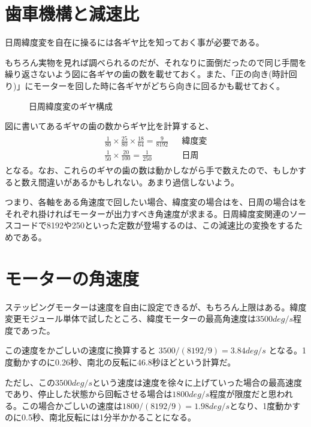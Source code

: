 \documentclass[letterpaper,10pt,dvipdfmx]{sphinxmanual}
\begin{document}
\section{歯車機構と減速比}
\label{\detokenize{nissyu-idohen/kikou:id4}}
日周緯度変を自在に操るには各ギヤ比を知っておく事が必要である。

もちろん実物を見れば調べられるのだが、それなりに面倒だったので同じ手間を繰り返さないよう図に各ギヤの歯の数を載せておく。また、「正の向き(時計回り)」にモーターを回した時に各ギヤがどちら向きに回るかも載せておく。
\begin{figure}[htbp]
\centering
\capstart

\noindent{}
\caption{日周緯度変のギヤ構成}\label{\detokenize{nissyu-idohen/kikou:id6}}\end{figure}

図に書いてあるギヤの歯の数からギヤ比を計算すると、
\begin{equation*}
\begin{split}\begin{aligned}
\frac{1}{80}\times\frac{25}{80}\times\frac{18}{64}=\frac{9}{8192}
&&\text{緯度変} \\
\frac{1}{50}\times\frac{20}{100}=\frac{1}{250}
&&\text{日周}\end{aligned}\end{split}
\end{equation*}
となる。なお、これらのギヤの歯の数は動かしながら手で数えたので、もしかすると数え間違いがあるかもしれない。あまり過信しないよう。

つまり、各軸をある角速度で回したい場合、緯度変の場合はを、日周の場合はをそれぞれ掛ければモーターが出力すべき角速度が求まる。日周緯度変関連のソースコードで8192や250といった定数が登場するのは、この減速比の変換をするためである。


\section{モーターの角速度}
\label{\detokenize{nissyu-idohen/kikou:id5}}
ステッピングモーターは速度を自由に設定できるが、もちろん上限はある。緯度変更モジュール単体で試したところ、緯度モーターの最高角速度は\(3500 deg/s\)程度であった。

この速度をかごしいの速度に換算すると \(3500/(8192/9)=3.84 deg/s\)
となる。1度動かすのに0.26秒、南北の反転に46.8秒ほどという計算だ。

ただし、この\(3500 deg/s\)という速度は速度を徐々に上げていった場合の最高速度であり、停止した状態から回転させる場合は\(1800 deg/s\)程度が限度だと思われる。この場合かごしいの速度は\(1800/(8192/9)=1.98 deg/s\)となり、1度動かすのに0.5秒、南北反転には1分半かかることになる。
\end{document}
